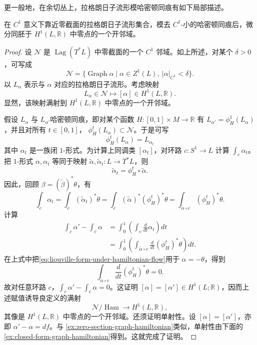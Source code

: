 更一般地，在余切丛上，拉格朗日子流形模哈密顿同痕有如下局部描述。

\begin{proposition}\label{prop:local-lagrangians-mod-hamiltonian}
在 $C^1$ 意义下靠近零截面的拉格朗日子流形集合，模去 $C^1$-小的哈密顿同痕后，微分同胚于 $H^1(L,\mathbb R)$ 中零点的一个开邻域。
\end{proposition}

\begin{proof}
设 $\mathcal N$ 是 $\operatorname{Lag}(T^*L)$ 中零截面的一个 $C^1$ 邻域。如上所述，对某个 $\delta>0$，可写成
\begin{equation}
 \mathcal N
 =\{\operatorname{Graph}\alpha\mid\alpha\in Z^1(L),\ |\alpha|_{C^1}<\delta\}.
 \label{eq:lagrangian-zero-neighborhood}
\end{equation}
以 $L_\alpha$ 表示与 $\alpha$ 对应的拉格朗日子流形。考虑映射
\[
 L_\alpha\in\mathcal N\longmapsto[\alpha]\in H^1(L,\mathbb R).
\]
显然，该映射满射到 $H^1(L,\mathbb R)$ 中零点的一个开邻域。

假设 $L_\alpha$ 与 $L_{\alpha'}$哈密顿同痕，即对某个函数
$H:[0,1]\times M\to\mathbb R$ 有
$L_{\alpha'}=\phi_H^1(L_\alpha)$，并且对所有 $t\in[0,1]$，
$\phi_H^t(L_\alpha)\subset\mathcal N$。于是可写
\begin{equation}
 \phi_H^t(L_\alpha)=L_{\alpha_t}
 \label{eq:hamiltonian-graph-family}
\end{equation}
其中 $\alpha_t$ 是一族闭 $1$-形式。为计算上同调类 $[\alpha_t]$，对环路
$c:S^1\to L$ 计算 $\int_c\alpha_t$。把 $1$-形式 $\alpha,\alpha_t$ 等同于映射
$\widetilde\alpha,\widetilde\alpha_t:L\to T^*L$，则
\[
 \widetilde\alpha_t=\phi_H^t\circ\widetilde\alpha.
\]
因此，回顾 $\beta=(\widetilde\beta)^*\theta$，有
\[
 \int_c\alpha_t
 =\int_c(\widetilde\alpha_t)^*\theta
 =\int_c(\widetilde\alpha)^*(\phi_H^t)^*\theta
 =\int_{\widetilde\alpha\circ c}(\phi_H^t)^*\theta.
\]
计算
\[
\begin{aligned}
 \int_c\alpha'-\int_c\alpha
 &=\int_0^1\left(\int_c\frac d{dt}\alpha_t\right)dt\\
 &=\int_0^1\left(\int_{\widetilde\alpha\circ c}
     \frac d{dt}(\phi_H^t)^*\theta\right)dt.
\end{aligned}
\]
在上式中把\eqref{eq:liouville-form-under-hamiltonian-flow}用于
$\alpha=-\theta$，得到
\[
 \int_{\widetilde\alpha\circ c}\frac d{dt}(\phi_H^t)^*\theta=0.
\]
故对任意环路 $c$，$\int_c\alpha'-\int_c\alpha=0$。这证明
$[\alpha]=[\alpha']\in H^1(L;\mathbb R)$，因而上述赋值诱导良定义的满射
\[
 \mathcal N/\operatorname{Ham}\longrightarrow H^1(L,\mathbb R),
\]
其像是 $H^1(L,\mathbb R)$ 中零点的一个开邻域。还须证明单射性。设
$[\alpha]=[\alpha']$，亦即 $\alpha'-\alpha=df$。与
\cref{ex:zero-section-graph-hamiltonian}类似，单射性由下面的
\cref{ex:closed-form-graph-hamiltonian}得到。这就完成了证明。
\end{proof}

